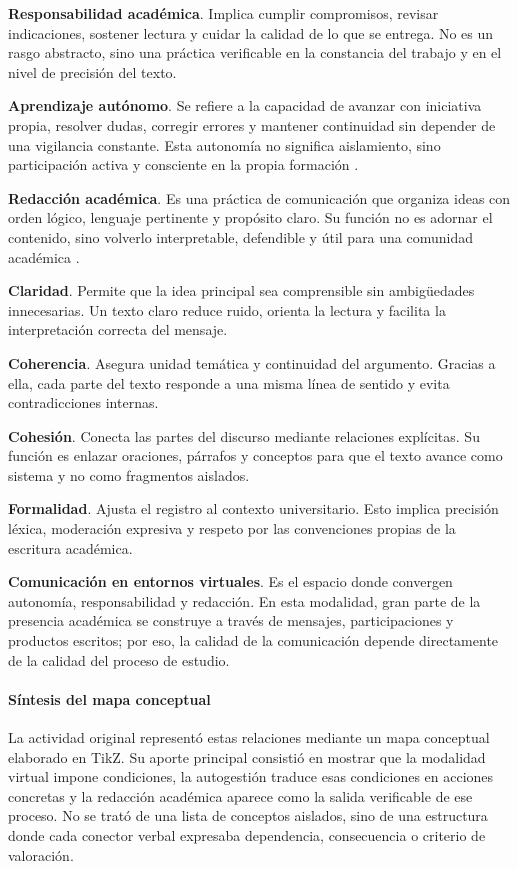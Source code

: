 \textbf{Responsabilidad académica}. Implica cumplir compromisos, revisar indicaciones, sostener lectura y cuidar la calidad de lo que se entrega. No es un rasgo abstracto, sino una práctica verificable en la constancia del trabajo y en el nivel de precisión del texto.

\textbf{Aprendizaje autónomo}. Se refiere a la capacidad de avanzar con iniciativa propia, resolver dudas, corregir errores y mantener continuidad sin depender de una vigilancia constante. Esta autonomía no significa aislamiento, sino participación activa y consciente en la propia formación \citep{correaManualBasicoEscritura2018}.

\textbf{Redacción académica}. Es una práctica de comunicación que organiza ideas con orden lógico, lenguaje pertinente y propósito claro. Su función no es adornar el contenido, sino volverlo interpretable, defendible y útil para una comunidad académica \citep{nunezcortesEscrituraAcademicaTeoria2015}.

\textbf{Claridad}. Permite que la idea principal sea comprensible sin ambigüedades innecesarias. Un texto claro reduce ruido, orienta la lectura y facilita la interpretación correcta del mensaje.

\textbf{Coherencia}. Asegura unidad temática y continuidad del argumento. Gracias a ella, cada parte del texto responde a una misma línea de sentido y evita contradicciones internas.

\textbf{Cohesión}. Conecta las partes del discurso mediante relaciones explícitas. Su función es enlazar oraciones, párrafos y conceptos para que el texto avance como sistema y no como fragmentos aislados.

\textbf{Formalidad}. Ajusta el registro al contexto universitario. Esto implica precisión léxica, moderación expresiva y respeto por las convenciones propias de la escritura académica.

\textbf{Comunicación en entornos virtuales}. Es el espacio donde convergen autonomía, responsabilidad y redacción. En esta modalidad, gran parte de la presencia académica se construye a través de mensajes, participaciones y productos escritos; por eso, la calidad de la comunicación depende directamente de la calidad del proceso de estudio.

\paragraph{Síntesis del mapa conceptual}

La actividad original representó estas relaciones mediante un mapa conceptual elaborado en TikZ. Su aporte principal consistió en mostrar que la modalidad virtual impone condiciones, la autogestión traduce esas condiciones en acciones concretas y la redacción académica aparece como la salida verificable de ese proceso. No se trató de una lista de conceptos aislados, sino de una estructura donde cada conector verbal expresaba dependencia, consecuencia o criterio de valoración.

